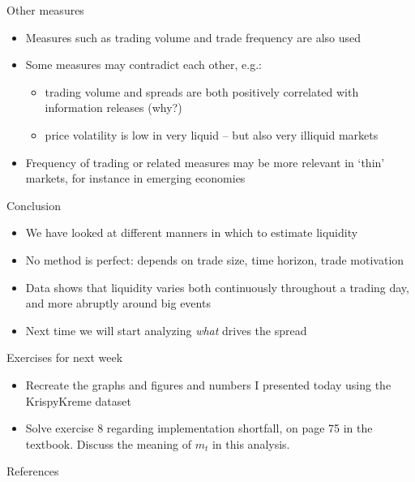 \documentclass[english,10pt
,aspectratio=169
]{beamer}
\begin{document}
\begin{frame}{Other measures}
\begin{itemize}
	\item Measures such as trading volume and trade frequency are also used
	\item Some measures may contradict each other, e.g.:
	\begin{itemize}
		\item trading volume and spreads are both positively correlated with information releases (why?)
		\item price volatility is low in very liquid -- but also very illiquid markets
	\end{itemize}
	\item Frequency of trading or related measures may be more relevant in `thin' markets, for instance in emerging economies
\end{itemize}
\end{frame}


\begin{frame}{Conclusion}
	\begin{itemize}
		\item We have looked at different manners in which to estimate liquidity
		\item No method is perfect: depends on trade size, time horizon, trade motivation
		\item Data shows that liquidity varies both continuously throughout a trading day, and more abruptly around big events
		\item Next time we will start analyzing \textit{what} drives the spread
	\end{itemize}
\end{frame}


\begin{frame}{Exercises for next week}
	\begin{itemize}
		\item Recreate the graphs and figures and numbers I presented today using the KrispyKreme dataset
		\item Solve exercise 8 regarding implementation shortfall, on page 75 in the textbook.
		Discuss the meaning of $m_t$ in this analysis.
	\end{itemize}
\end{frame}




\appendix
\begin{frame}[allowframebreaks]{References}
	
	
\end{frame}
\end{document}
